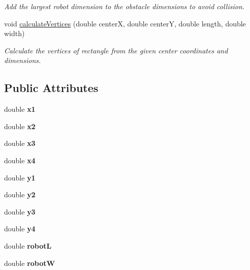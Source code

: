 \begin{DoxyCompactItemize}
\begin{DoxyCompactList}\small\item\em Add the largest robot dimension to the obstacle dimensions to avoid collision. \end{DoxyCompactList}\item 
void \mbox{\hyperlink{class_obstacle_a6d9d68a2be2e09948bf04b1845ac3b6a}{calculate\+Vertices}} (double centerX, double centerY, double length, double width)
\begin{DoxyCompactList}\small\item\em Calculate the vertices of rectangle from the given center coordinates and dimensions. \end{DoxyCompactList}\end{DoxyCompactItemize}
\subsection*{Public Attributes}
\begin{DoxyCompactItemize}
\item 
\mbox{\label{class_obstacle_a9e8499349b6d25cffe1f3899e69319cd}} 
double {\bfseries x1}
\item 
\mbox{\label{class_obstacle_ab01169a193a99a064090984dc3cdc172}} 
double {\bfseries x2}
\item 
\mbox{\label{class_obstacle_af2274bcdb4e8761b1e12dbf80c0ace0e}} 
double {\bfseries x3}
\item 
\mbox{\label{class_obstacle_aa8dab75801af2bf00eb7ea712029ca58}} 
double {\bfseries x4}
\item 
\mbox{\label{class_obstacle_a4c7931850f0651ba1c3b5aed910740d2}} 
double {\bfseries y1}
\item 
\mbox{\label{class_obstacle_adb4c00968e75a7b313691ac211d8f682}} 
double {\bfseries y2}
\item 
\mbox{\label{class_obstacle_a47770d438d12b050b39c8c7f96f889cd}} 
double {\bfseries y3}
\item 
\mbox{\label{class_obstacle_ace1b06cfaa4b568a65e7474568219efc}} 
double {\bfseries y4}
\item 
\mbox{\label{class_obstacle_a72828feb7f037175d09e656a07974850}} 
double {\bfseries robotL}
\item 
\mbox{\label{class_obstacle_a34cbdb061aef1da64cc824b52151ee78}} 
double {\bfseries robotW}
\end{DoxyCompactItemize}


